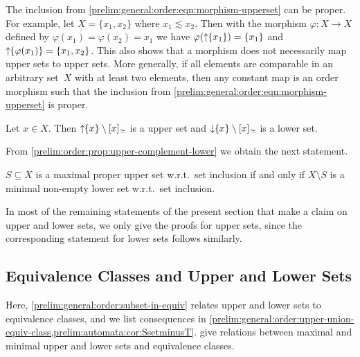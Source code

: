\begin{remark}\label{prelim:general:order:rem:morphism-upperset}
	The inclusion from \cref{prelim:general:order:eqn:morphism-upperset} 
	can be proper. For example, let $X = \{x_1, x_2\}$ where $x_1 \lesssim x_2$.
	Then with the morphism $\varphi \colon X \to X$ defined by $\varphi(x_1) = \varphi(x_2) = x_1$
	we have $\varphi(\mbox{\ensuremath{\displaystyle \uparrow \!\!\{x_1\}}}) = \{x_1\}$
	and $\mbox{\ensuremath{\displaystyle \uparrow \!\!\{\varphi(x_1)\}}} = \{x_1, x_2\}$. This also shows
	that a morphism does not necessarily map upper sets to upper sets.
	More generally, if all elements are comparable in an arbitrary set~$X$ with at least two elements,
	then any constant map is an order morphism
	such that the inclusion from \cref{prelim:general:order:eqn:morphism-upperset}
	is proper.
\end{remark}

\begin{remark}
	Let $x \in X$. Then $\mbox{\ensuremath{\displaystyle \uparrow \!\!\{x\}}} \setminus [x]_{\simeq}$ is a upper set
	and $\downarrow \!\!\{x\} \setminus [x]_{\simeq}$ is a lower set.
\end{remark}

From \cref{prelim:order:prop:upper-complement-lower} 
we obtain the next statement.

\begin{proposition} \label{prelim:general:order:max-proper-upper-iff-min-nonempty-lower}
	$S \subseteq X$ is a maximal proper upper set w.r.t.~set inclusion
	if and only if $X \setminus S$ is a minimal non-empty lower set w.r.t.~set inclusion.
\end{proposition}

\begin{remark}
	\label{prelim:general:order:rem:upper-and-lower}
	In most of the remaining statements
	of the present section that make a claim on upper and lower sets, 
	we only give the proofs for upper sets, since the corresponding statement for lower sets
	follows similarly.
\end{remark}

\subsection{Equivalence Classes and Upper and Lower Sets}
\label{prelim:gen:order:sec:eq-upper-lower}

Here, \cref{prelim:general:order:subset-in-equiv}
relates upper and lower sets to equivalence classes,
and we list consequences in \cref{prelim:general:order:upper-union-equiv-class,prelim:automata:cor:SsetminusT}.
 give relations between maximal and minimal upper and lower sets
and equivalence classes.

